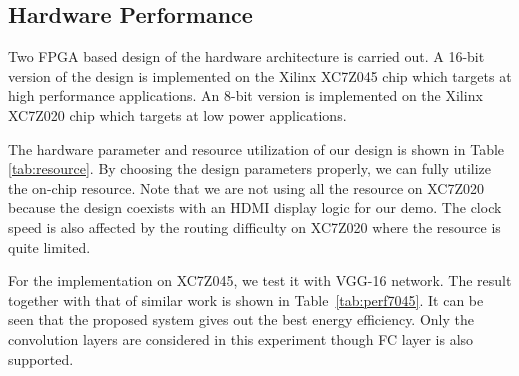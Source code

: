 \documentclass[10pt, conference, compsocconf]{IEEEtran}
\begin{document}
\subsection{Hardware Performance}
Two FPGA based design of the hardware architecture is carried out. A 16-bit version of the design is implemented on the Xilinx XC7Z045 chip which targets at high performance applications. An 8-bit version is implemented on the Xilinx XC7Z020 chip which targets at low power applications.

The hardware parameter and resource utilization of our design is shown in Table \ref{tab:resource}. By choosing the design parameters properly, we can fully utilize the on-chip resource. Note that we are not using all the resource on XC7Z020 because the design coexists with an HDMI display logic for our demo. The clock speed is also affected by the routing difficulty on XC7Z020 where the resource is quite limited.

For the implementation on XC7Z045, we test it with VGG-16 network. The result together with that of similar work is shown in Table~\ref{tab:perf7045}. It can be seen that the proposed system gives out the best energy efficiency. Only the convolution layers are considered in this experiment though FC layer is also supported.
\end{document}
